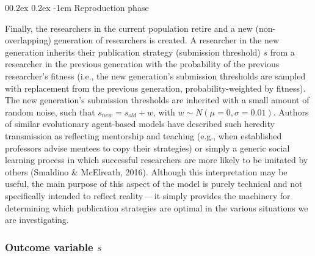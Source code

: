 \documentclass[
  ,man,mask,floatsintext]{apa6}
\makeatletter
\let\oldparagraph\paragraph
\renewcommand{\paragraph}[1]{\oldparagraph{#1}\mbox{}}
\renewcommand{\paragraph}{\@startsection{paragraph}{4}{\parindent}%
  {0\baselineskip \@plus 0.2ex \@minus 0.2ex}%
  {-1em}%
  {\normalfont\normalsize\bfseries\itshape\typesectitle}}
\makeatother
\begin{document}
\hypertarget{reproduction-phase}{%
\paragraph{Reproduction phase}\label{reproduction-phase}}

Finally, the researchers in the current population retire and a new (non-overlapping) generation of researchers is created.
A researcher in the new generation inherits their publication strategy (submission threshold) \(s\) from a researcher in the previous generation with the probability of the previous researcher's fitness (i.e., the new generation's submission thresholds are sampled with replacement from the previous generation, probability-weighted by fitness).
The new generation's submission thresholds are inherited with a small amount of random noise, such that \(s_{new} = s_{old} + w\), with \(w \sim N(\mu = 0, \sigma = 0.01)\).
Authors of similar evolutionary agent-based models have described such heredity transmission as reflecting mentorship and teaching (e.g., when established professors advise mentees to copy their strategies) or simply a generic social learning process in which successful researchers are more likely to be imitated by others (Smaldino \& McElreath, 2016).
Although this interpretation may be useful, the main purpose of this aspect of the model is purely technical and not specifically intended to reflect reality\(\,\)---\(\,\)it simply provides the machinery for determining which publication strategies are optimal in the various situations we are investigating.

\hypertarget{outcome-variable-s}{%
\subsubsection{\texorpdfstring{Outcome variable \(s\)}{Outcome variable s}}\label{outcome-variable-s}}
\end{document}
